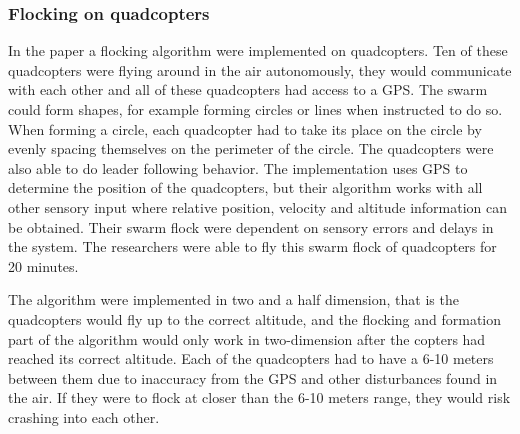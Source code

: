 \subsubsection{Flocking on quadcopters}
In the paper \citep{Csaba2014} a flocking algorithm were implemented on quadcopters. Ten of these quadcopters were flying around in the air autonomously, they would communicate with each other and all of these quadcopters had access to a GPS.
The swarm could form shapes, for example forming circles or lines when instructed to do so. When forming a circle, each quadcopter had to take its place on the circle by evenly spacing themselves on the perimeter of the circle. The quadcopters were also able to do leader following behavior.
The implementation uses GPS to determine the position of the quadcopters, but their algorithm works with all other sensory input where relative position, velocity and altitude information can be obtained. Their swarm flock were dependent on sensory errors and delays in the system. The researchers were able to fly this swarm flock of quadcopters for 20 minutes.

The algorithm were implemented in two and a half dimension, that is the quadcopters would fly up to the correct altitude, and the flocking and formation part of the algorithm would only work in two-dimension after the copters had reached its correct altitude. Each of the quadcopters had to have a 6-10 meters between them due to inaccuracy from the GPS and other disturbances found in the air. If they were to flock at closer than the 6-10 meters range, they would risk crashing into each other.




